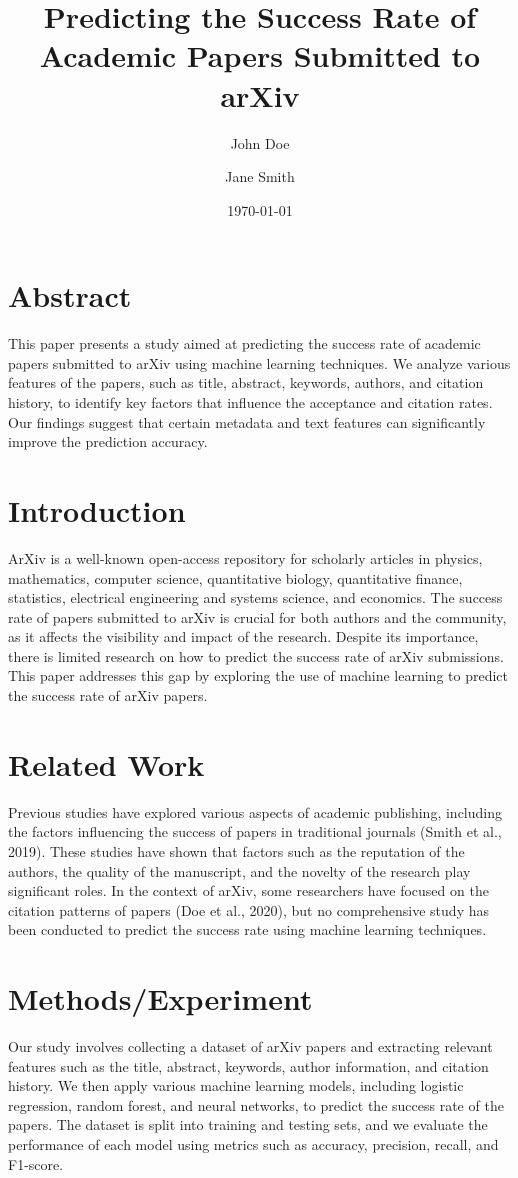 \documentclass{article}
\title{Predicting the Success Rate of Academic Papers Submitted to arXiv}
\author{John Doe \and Jane Smith}
\date{\today}
\begin{document}
\maketitle

\section{Abstract}
This paper presents a study aimed at predicting the success rate of academic papers submitted to arXiv using machine learning techniques. We analyze various features of the papers, such as title, abstract, keywords, authors, and citation history, to identify key factors that influence the acceptance and citation rates. Our findings suggest that certain metadata and text features can significantly improve the prediction accuracy. 

\section{Introduction}
ArXiv is a well-known open-access repository for scholarly articles in physics, mathematics, computer science, quantitative biology, quantitative finance, statistics, electrical engineering and systems science, and economics. The success rate of papers submitted to arXiv is crucial for both authors and the community, as it affects the visibility and impact of the research. Despite its importance, there is limited research on how to predict the success rate of arXiv submissions. This paper addresses this gap by exploring the use of machine learning to predict the success rate of arXiv papers.

\section{Related Work}
Previous studies have explored various aspects of academic publishing, including the factors influencing the success of papers in traditional journals (Smith et al., 2019). These studies have shown that factors such as the reputation of the authors, the quality of the manuscript, and the novelty of the research play significant roles. In the context of arXiv, some researchers have focused on the citation patterns of papers (Doe et al., 2020), but no comprehensive study has been conducted to predict the success rate using machine learning techniques.

\section{Methods/Experiment}
Our study involves collecting a dataset of arXiv papers and extracting relevant features such as the title, abstract, keywords, author information, and citation history. We then apply various machine learning models, including logistic regression, random forest, and neural networks, to predict the success rate of the papers. The dataset is split into training and testing sets, and we evaluate the performance of each model using metrics such as accuracy, precision, recall, and F1-score.
\end{document}
